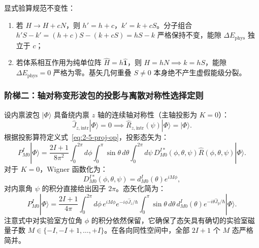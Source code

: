 显式验算规范不变性：
\begin{enumerate}
\item 若 $H \to H + c N$，则 $h' = h + c$，$k' = k + c S$。分子组合 $h' S - k' = (h + c) S - (k + c S) = h S - k$ 严格保持不变，能隙 $\Delta E_{\text{phys}}$ 独立于 $c$；
\item 若体系相互作用为纯单位阵 $\hat{H} = h \hat{\mathbf{1}}$，则 $H = h N \implies k = h S$，能隙 $\Delta E_{\text{phys}} = 0$ 严格为零。基矢几何重叠 $S \ne 0$ 本身绝不产生虚假能级分裂。
\end{enumerate}

\subsubsection{阶梯二：轴对称变形波包的投影与离散对称性选择定则}\label{sec:2-5-5-2}

设内禀波包 $|\Phi\rangle$ 具备绕内禀 $z$ 轴的连续轴对称性（主轴投影为 $K = 0$）：
\begin{equation}\label{eq:2-5-axial-condition}
\hat{J}_{z, \text{intr}} |\Phi\rangle = 0 \implies \hat{R}_{z, \text{intr}}(\psi) |\Phi\rangle = |\Phi\rangle.
\end{equation}
根据投影算符定义式~\eqref{eq:2-5-proj-op}，投影态矢为：
\begin{equation}\label{eq:2-5-axial-proj-state}
P^I_{M0} |\Phi\rangle = \frac{2I+1}{8\pi^2} \int_0^{2\pi} d\phi \int_0^\pi \sin\theta \, d\theta \int_0^{2\pi} d\psi \, D^{I*}_{M0}(\phi, \theta, \psi) \hat{R}(\phi, \theta, \psi) |\Phi\rangle.
\end{equation}
对于 $K = 0$，Wigner 函数化为：
\begin{equation}\label{eq:2-5-D-axial-form}
D^{I*}_{M0}(\phi, \theta, \psi) = d^I_{M0}(\theta) e^{i M \phi},
\end{equation}
对内禀角 $\psi$ 的积分直接给出因子 $2\pi$。态矢化简为：
\begin{equation}\label{eq:2-5-axial-state-simplified}
P^I_{M0} |\Phi\rangle = \frac{2I+1}{4\pi} \int_0^{2\pi} d\phi \, e^{i M \phi} e^{-i \phi \hat{J}_z / \hbar} \int_0^\pi \sin\theta \, d\theta \, d^I_{M0}(\theta) e^{-i \theta \hat{J}_y / \hbar} |\Phi\rangle.
\end{equation}
注意式中对实验室方位角 $\phi$ 的积分依然保留，它确保了态矢具有确切的实验室磁量子数 $M \in \{-I, -I+1, \dots, +I\}$。在各向同性空间中，全部 $2I+1$ 个 $M$ 态严格简并。

